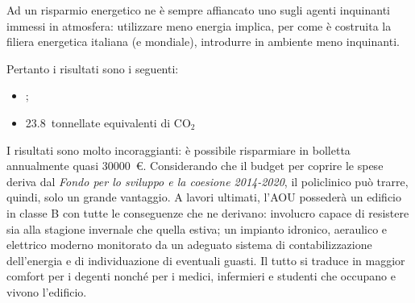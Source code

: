 Ad un risparmio energetico ne è sempre affiancato uno sugli agenti inquinanti immessi in atmosfera: utilizzare meno energia implica, per come è costruita la filiera energetica italiana (e mondiale), introdurre in ambiente meno inquinanti. 

Pertanto i risultati sono i seguenti:
\begin{itemize}
	\item {}; %
	\item \num{23.8}\ tonnellate equivalenti di $\mathrm{CO_2}$ %
\end{itemize}

I risultati sono molto incoraggianti: è possibile risparmiare in bolletta annualmente quasi \num{30000}\ \euro. Considerando che il budget per coprire le spese deriva dal \emph{Fondo per lo sviluppo e la coesione 2014-2020}, il policlinico può trarre, quindi, solo un grande vantaggio. A lavori ultimati, l'AOU possederà un edificio in classe B con tutte le conseguenze che ne derivano: involucro capace di resistere sia alla stagione invernale che quella estiva; un impianto idronico, aeraulico e elettrico moderno monitorato da un adeguato sistema di contabilizzazione dell'energia e di individuazione di eventuali guasti. Il tutto si traduce in maggior comfort per i degenti nonché per i medici, infermieri e studenti che occupano e vivono l'edificio.